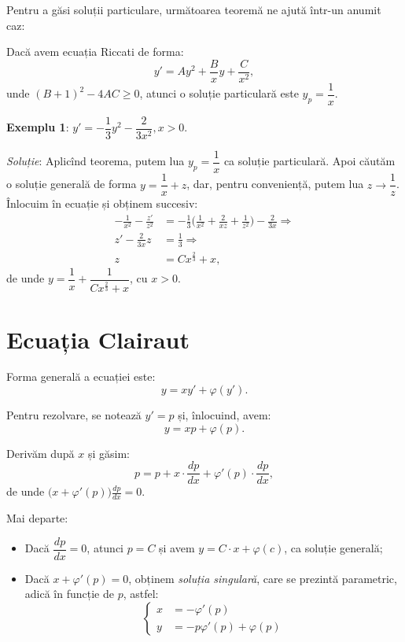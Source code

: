 Pentru a găsi soluții particulare, următoarea teoremă ne ajută într-un anumit caz:

\begin{theorem}\label{thm:ric}
  Dacă avem ecuația Riccati de forma:
  \[
    y' = Ay^2 + \frac{B}{x}y + \frac{C}{x^2},
  \]
  unde $(B + 1)^2 - 4AC \geq 0$, atunci o soluție particulară este $y_p = \dfrac{1}{x}$.
\end{theorem}

\textbf{Exemplu 1}: $y' = -\dfrac{1}{3} y^2 - \dfrac{2}{3x^2}, x > 0$.

\emph{Soluție}: Aplicînd teorema, putem lua $y_p = \dfrac{1}{x}$ ca soluție particulară.
Apoi căutăm o soluție generală de forma $y = \dfrac{1}{x} + z$, dar, pentru conveniență,
putem lua $z \to \dfrac{1}{z}$. Înlocuim în ecuație și obținem succesiv:
\begin{align*}
  -\frac{1}{x^2} - \frac{z'}{z^2} &= -\frac{1}{3} \Big( \frac{1}{x^2} + \frac{2}{xz} + \frac{1}{z^2} \Big) - \frac{2}{3x} \Rightarrow \\
  z' - \frac{2}{3x} z &= \frac{1}{3} \Rightarrow \\
  z &= Cx^{\frac{2}{3}} + x,
\end{align*}
de unde $y = \dfrac{1}{x} + \dfrac{1}{Cx^{\frac{2}{3}} + x}$, cu $x > 0$.


\section{Ecuația Clairaut}
\label{sec:clairaut}

Forma generală a ecuației este:
\[
  y = xy' + \varphi(y').
\]

Pentru rezolvare, se notează $y' = p$ și, înlocuind, avem:
\[
  y = xp + \varphi(p).
\]

Derivăm după $x$ și găsim:
\[
  p = p + x \cdot \frac{dp}{dx} + \varphi'(p) \cdot \frac{dp}{dx},
\]
de unde $\big( x + \varphi'(p) \big) \frac{dp}{dx} = 0$.

Mai departe:
\begin{itemize}
\item Dacă $\dfrac{dp}{dx} = 0$, atunci $p = C$ și avem $y = C \cdot x + \varphi(c)$, ca soluție generală;
\item Dacă $x + \varphi'(p) = 0$, obținem \emph{soluția singulară}, care se prezintă parametric, adică
  în funcție de $p$, astfel:
  \[
    \begin{cases}
      x &= -\varphi'(p) \\
      y &= -p\varphi'(p) + \varphi(p)
    \end{cases}
  \]
\end{itemize}

